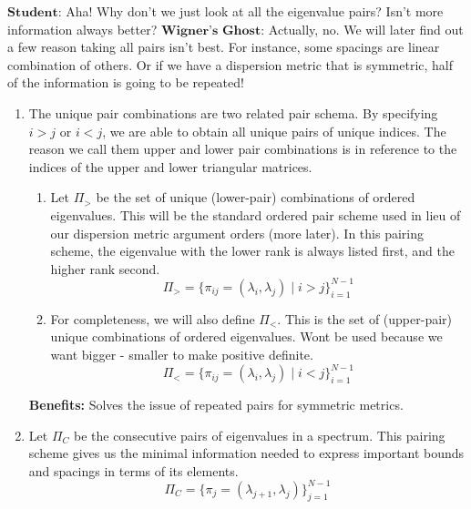 $\textbf{Student:}$ Aha! Why don't we just look at all the eigenvalue pairs? Isn't more information always better? \hfill \newline
$\textbf{Wigner's Ghost:}$ Actually, no. We will later find out a few reason taking all pairs isn't best. For instance, some spacings are linear combination of others. Or if we have a dispersion metric that is symmetric, half of the information is going to be repeated! 


\begin{enumerate}
  \item The unique pair combinations are two related pair schema. By specifying $i > j$ or $i < j$, we are able to obtain all unique pairs of unique indices. The reason we call them upper and lower pair combinations is in reference to the indices of the upper and lower triangular matrices. \begin{enumerate}
    \item Let $\Pi_>$ be the set of unique (lower-pair) combinations of ordered eigenvalues. This will be the standard ordered pair scheme used in lieu of our dispersion metric argument orders (more later). In this pairing scheme, the eigenvalue with the lower rank is always listed first, and the higher rank second.
    $$\Pi_> = \{\pi_{ij} = (\lambda_i,\lambda_j) \mid i > j\}_{i = 1}^{N-1}$$
    \item For completeness, we will also define $\Pi_<$. This is the set of (upper-pair) unique combinations of ordered eigenvalues. Wont be used because we want bigger - smaller to make positive definite.
    $$\Pi_< = \{\pi_{ij} = (\lambda_i,\lambda_j) \mid i < j\}_{i = 1}^{N-1}$$
  \end{enumerate} 
  \textbf{Benefits:} Solves the issue of repeated pairs for symmetric metrics.  
\item Let $\Pi_C$ be the consecutive pairs of eigenvalues in a spectrum. This pairing scheme gives us the minimal information needed to express important bounds and spacings in terms of its elements.
$$\Pi_C = \{\pi_{j} = (\lambda_{j + 1},\lambda_j)\}_{j = 1}^{N-1}$$
\end{enumerate}

